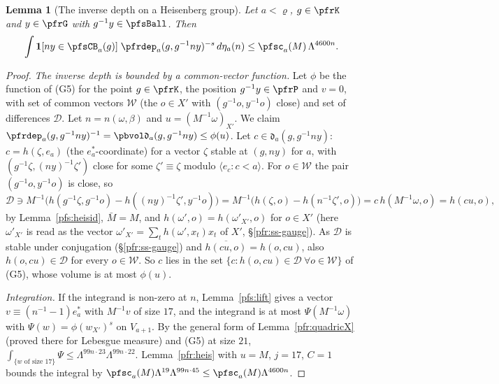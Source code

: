 \documentclass[10pt]{amsart}
\newtheorem{lemma}[theorem]{Lemma}
\theoremstyle{definition}
\theoremstyle{remark}
\begin{document}
\begin{lemma}[The inverse depth on a Heisenberg group]\label{pfs:invdepthN}
Let $a<\varrho$, $g\in\pfrK$ and $y\in\pfrG$ with $g^{-1}y\in\pfsBall$. Then
\[
\int\mathbf 1[ny\in\pfsCB_a(g)]\;\pfrdep_a(g,g^{-1}ny)^{-s}\,d\eta_a(n)\le\pfsc_a(M)\,\Lambda^{4600n}.
\]
\end{lemma}
\begin{proof}
\emph{The inverse depth is bounded by a common-vector function.} Let $\phi$ be the function of (G5) for the point
$g\in\pfrK$, the position $g^{-1}y\in\pfrP$ and $v=0$, with set of common vectors $\mathcal W$ (the $o\in X'$ with
$(g^{-1}o,y^{-1}o)$ close) and set of differences $\mathcal D$. Let $n=n(\omega,\beta)$ and $u=(M^{-1}\omega)_{X'}$. We claim
$\pfrdep_a(g,g^{-1}ny)^{-1}=\pbvol\mathfrak d_a(g,g^{-1}ny)\le\phi(u)$. Let $c\in\mathfrak d_a(g,g^{-1}ny)$: $c=h(\zeta,e_a)$
(the $e_a^*$-coordinate) for a vector $\zeta$ stable at $(g,ny)$ for $a$, with $(g^{-1}\zeta,(ny)^{-1}\zeta')$ close for some
$\zeta'\equiv\zeta$ modulo $\langle e_c:c<a\rangle$. For $o\in\mathcal W$ the pair $(g^{-1}o,y^{-1}o)$ is close, so
\[
\mathcal D\ni M^{-1}\bigl(h(g^{-1}\zeta,g^{-1}o)-h((ny)^{-1}\zeta',y^{-1}o)\bigr)=M^{-1}\bigl(h(\zeta,o)-h(n^{-1}\zeta',o)\bigr)=
c\,h(M^{-1}\omega,o)=h(cu,o),
\]
by Lemma~\ref{pfs:heisid}, $\bar M=M$, and $h(\omega',o)=h(\omega'_{X'},o)$ for $o\in X'$ (here $\omega'_{X'}$ is read as the
vector $\omega'_{X'}=\sum_th(\omega',x_t)x_t$ of $X'$, \S\ref{pfr:ss-gauge}). As $\mathcal D$ is stable under conjugation
(\S\ref{pfr:ss-gauge}) and $\overline{h(cu,o)}=h(o,cu)$, also $h(o,cu)\in\mathcal D$ for every $o\in\mathcal W$. So $c$ lies in the
set $\{c:h(o,cu)\in\mathcal D\ \forall o\in\mathcal W\}$ of (G5), whose volume is at most $\phi(u)$.

\emph{Integration.} If the integrand is non-zero at $n$, Lemma~\ref{pfs:lift} gives a vector $v\equiv(n^{-1}-1)e_a^*$
with $M^{-1}v$ of size $17$, and the integrand is at most $\Psi(M^{-1}\omega)$ with $\Psi(w)=\phi(w_{X'})^s$ on $V_{a+1}$.
By the general form of Lemma~\ref{pfr:quadricX} (proved there for Lebesgue measure) and (G5) at size $21$,
$\int_{\{w\text{ of size }17\}}\Psi\le\Lambda^{99n\cdot23}\Lambda^{99n\cdot22}$. Lemma~\ref{pfr:heis} with $u=M$, $j=17$, $C=1$ bounds the
integral by $\pfsc_a(M)\Lambda^{19}\Lambda^{99n\cdot45}\le\pfsc_a(M)\Lambda^{4600n}$.
\end{proof}
\end{document}
